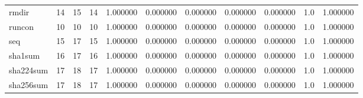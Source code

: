 \begin{tabular}{lrrrrrrrrrr}
rmdir     &                                      14 &                 15 &                                14 &                                   1.000000 &                               0.000000 &                                     0.000000 &                          0.000000 &                                0.000000 &                                1.0 &                                           1.000000 \\
runcon    &                                      10 &                 10 &                                10 &                                   1.000000 &                               0.000000 &                                     0.000000 &                          0.000000 &                                0.000000 &                                1.0 &                                           1.000000 \\
seq       &                                      15 &                 17 &                                15 &                                   1.000000 &                               0.000000 &                                     0.000000 &                          0.000000 &                                0.000000 &                                1.0 &                                           1.000000 \\
sha1sum   &                                      16 &                 17 &                                16 &                                   1.000000 &                               0.000000 &                                     0.000000 &                          0.000000 &                                0.000000 &                                1.0 &                                           1.000000 \\
sha224sum &                                      17 &                 18 &                                17 &                                   1.000000 &                               0.000000 &                                     0.000000 &                          0.000000 &                                0.000000 &                                1.0 &                                           1.000000 \\
sha256sum &                                      17 &                 18 &                                17 &                                   1.000000 &                               0.000000 &                                     0.000000 &                          0.000000 &                                0.000000 &                                1.0 &                                           1.000000 \\

\end{tabular}

